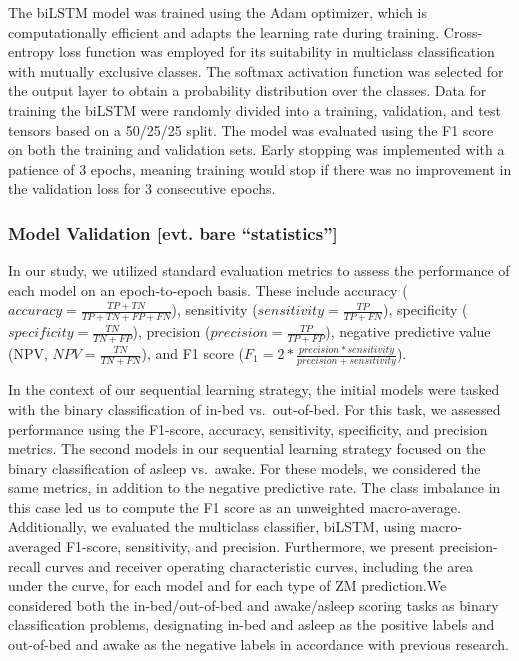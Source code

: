 \documentclass[
  super,
  preprint,
  3p]{elsarticle}
\begin{document}
The biLSTM model was trained using the Adam optimizer, which is
computationally efficient and adapts the learning rate during training.
Cross-entropy loss function was employed for its suitability in
multiclass classification with mutually exclusive classes. The softmax
activation function was selected for the output layer to obtain a
probability distribution over the classes. Data for training the biLSTM
were randomly divided into a training, validation, and test tensors
based on a 50/25/25 split. The model was evaluated using the F1 score on
both the training and validation sets. Early stopping was implemented
with a patience of 3 epochs, meaning training would stop if there was no
improvement in the validation loss for 3 consecutive epochs.

\hypertarget{model-validation-evt.-bare-statistics}{%
\subsubsection{Model Validation {[}evt. bare
``statistics''{]}}\label{model-validation-evt.-bare-statistics}}

In our study, we utilized standard evaluation metrics to assess the
performance of each model on an epoch-to-epoch basis. These include
accuracy (\(accuracy = \frac{TP+TN}{TP+TN+FP+FN}\)), sensitivity
(\(sensitivity = \frac{TP}{TP+FN}\)), specificity
(\(specificity = \frac{TN}{TN+FP}\)), precision
(\(precision = \frac{TP}{TP+FP}\)), negative predictive value (NPV,
\(NPV = \frac{TN}{TN + FN}\)), and F1 score
(\(F_1 = 2 * \frac{precision * sensitivity}{precision + sensitivity}\)).

In the context of our sequential learning strategy, the initial models
were tasked with the binary classification of in-bed vs.~out-of-bed. For
this task, we assessed performance using the F1-score, accuracy,
sensitivity, specificity, and precision metrics. The second models in
our sequential learning strategy focused on the binary classification of
asleep vs.~awake. For these models, we considered the same metrics, in
addition to the negative predictive rate. The class imbalance in this
case led us to compute the F1 score as an unweighted macro-average.
Additionally, we evaluated the multiclass classifier, biLSTM, using
macro-averaged F1-score, sensitivity, and precision. Furthermore, we
present precision-recall curves and receiver operating characteristic
curves, including the area under the curve, for each model and for each
type of ZM prediction.We considered both the in-bed/out-of-bed and
awake/asleep scoring tasks as binary classification problems,
designating in-bed and asleep as the positive labels and out-of-bed and
awake as the negative labels in accordance with previous
research\citep{hjorth2012, kushida2001}.
\end{document}
